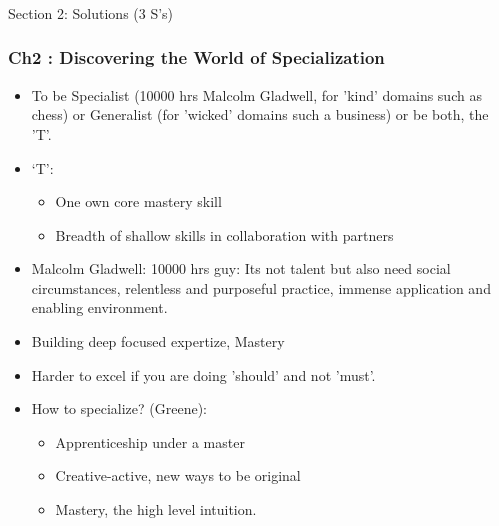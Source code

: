 \begin{frame}[fragile]\frametitle{}
\begin{center}
{\Large Section 2: Solutions (3 S's)}

\end{center}
\end{frame}
\begin{frame}[fragile]\frametitle{Ch2 : Discovering the World of Specialization}

\begin{itemize}
\item To be Specialist (10000 hrs Malcolm Gladwell, for 'kind' domains such as chess) or Generalist (for 'wicked' domains such a business) or be both, the 'T'.
\item `T': 
	\begin{itemize}
	\item One own core mastery skill
	\item Breadth of shallow skills in collaboration with partners
	\end{itemize}
\item Malcolm Gladwell: 10000 hrs guy: Its not talent but also need  social circumstances, relentless and purposeful practice, immense application and enabling environment.
\item Building deep focused expertize, Mastery
\item Harder to excel if you are doing 'should' and not 'must'.
\item How to specialize? (Greene):
	\begin{itemize}
	\item Apprenticeship under a master
	\item Creative-active, new ways to be original
	\item Mastery, the high level intuition.
	\end{itemize}
\end{itemize}

\end{frame}

